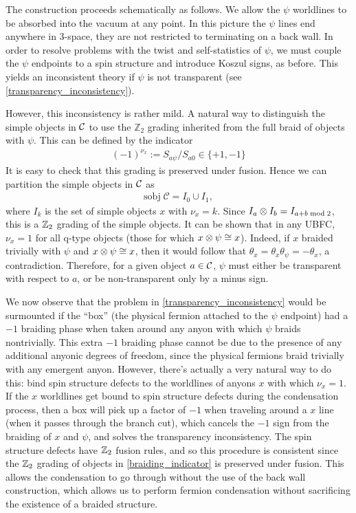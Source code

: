 The construction proceeds schematically as follows.
We allow the $\psi$ worldlines to be absorbed into the vacuum at any point.
In this picture the $\psi$ lines end anywhere in 3-space, they are not restricted to terminating on a back wall. 
In order to resolve problems with the twist and self-statistics of $\psi$, 
we must couple the $\psi$ endpoints to a spin structure and introduce Koszul signs, as before.
This yields an inconsistent theory if $\psi$ is not transparent (see \eqref{transparency_inconsistency}).

However, this inconsistency is rather mild. 
A natural way to distinguish the simple objects in $\mathcal{C}$ to use the $\mathbb{Z}_2$ 
grading inherited from the full braid of objects with $\psi$. 
This can be defined by the indicator 
\begin{align} 
(-1)^{\nu_x} := S_{a \psi}/S_{a0} \in \{+1, -1 \}
\label{grading}
\end{align}
It is easy to check that this grading is preserved under fusion.
Hence we can partition the simple objects in $\mathcal{C}$ as 
\begin{align} \label{braiding_indicator}
\text{sobj}\; \mathcal{C}  = I_0 \cup I_1,
\end{align}
where $I_k$ is the set of simple objects $x$ with $\nu_x = k$.
Since $I_a \otimes I_b = I_{a+b\; \text{mod} \; 2}$, this is a $\mathbb{Z}_2$ grading of the simple objects. 
It can be shown that in any UBFC, $\nu_x = 1$ for all q-type objects (those for which $x\otimes \psi \cong x$).
Indeed, if $x$ braided trivially with $\psi$ and $x\otimes \psi \cong x$, then it would follow that
$\theta_x = \theta_x \theta_\psi = -\theta_x$, a contradiction.
Therefore, for a given object $a\in\mathcal{C}$, $\psi$ must either be transparent with respect to $a$, or be non-transparent only by a minus sign. 

We now observe that the problem in \eqref{transparency_inconsistency} would be 
surmounted if the ``box'' (the physical fermion attached to the $\psi$ endpoint) had a $-1$ 
braiding phase when taken around any anyon with which $\psi$ braids nontrivially. 
This extra $-1$ braiding phase cannot be due to the presence of any additional anyonic 
degrees of freedom, since the physical fermions braid trivially with any emergent anyon. 
However, there's actually a very natural way to do this: bind spin structure defects to the 
worldlines of anyons $x$ with which $\nu_x=1$. 
If the $x$ worldlines get bound to spin structure defects during the condensation 
process, then a box will pick up a factor of $-1$ when traveling around a $x$ line 
(when it passes through the branch cut), which cancels the $-1$ sign from the braiding of 
$x$ and $\psi$, and solves the transparency inconsistency. 
The spin structure defects have $\mathbb{Z}_2$ fusion rules, and so this procedure is consistent since 
the $\mathbb{Z}_2$ grading of objects in \eqref{braiding_indicator} is preserved under fusion. 
This allows the condensation to go through without the use of the back wall construction, 
which allows us to perform fermion condensation without sacrificing the existence of a 
braided structure. 

